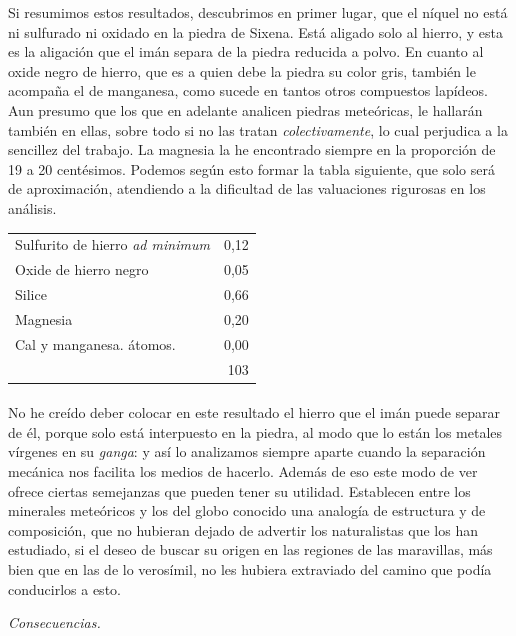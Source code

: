 \documentclass[a4paper, 11pt, oneside, polutonikogreek, spanish]{article}
\begin{document}
Si resumimos estos resultados, descubrimos en primer lugar, que el níquel no está ni sulfurado ni oxidado en la piedra de Sixena. Está aligado solo al hierro, y esta es la aligación que el imán separa de la piedra reducida a polvo. En cuanto al oxide negro de hierro, que es a quien debe la piedra su color gris, también le acompaña el de manganesa, como sucede en tantos otros compuestos lapídeos. Aun presumo que los que en adelante analicen piedras meteóricas, le hallarán también en ellas, sobre todo si no las tratan \emph{colectivamente}, lo cual perjudica a la sencillez del trabajo. La magnesia la he encontrado siempre en la proporción de 19 a 20 centésimos. Podemos según esto formar la tabla siguiente, que solo será de aproximación, atendiendo a la dificultad de las valuaciones rigurosas en los análisis.
\begin{table}[!h]
    \centering
    \bfseries
    \begin{tabular}{l r}
        Sulfurito de hierro \emph{ad minimum} & 0,12 \\
        Oxide de hierro negro & 0,05 \\
        Silice & 0,66 \\
        Magnesia & 0,20 \\
        Cal y manganesa. átomos. & 0,00 \\ \hline
         ~ & 103 \\
    \end{tabular}
\end{table}
\paragraph{}
No he creído deber colocar en este resultado el hierro que el imán puede separar de él, porque solo está interpuesto en la piedra, al modo que lo están los metales vírgenes en su \emph{ganga}: y así lo analizamos siempre aparte cuando la separación mecánica nos facilita los medios de hacerlo. Además de eso este modo de ver ofrece ciertas semejanzas que pueden tener su utilidad. Establecen entre los minerales meteóricos y los del globo conocido una analogía de estructura y de composición, que no hubieran dejado de advertir los naturalistas que los han estudiado, si el deseo de buscar su origen en las regiones de las maravillas, más bien que en las de lo verosímil, no les hubiera extraviado del camino que podía conducirlos a esto.
\begin{center}
\emph{Consecuencias.}
\end{center}
\end{document}
